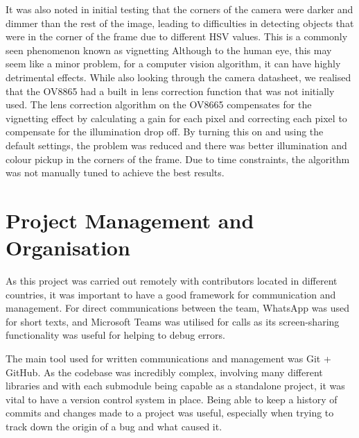 \documentclass[a4paper]{article}
\begin{document}
    It was also noted in 
    initial testing that the corners of the camera were darker and dimmer than the rest 
    of the image, leading to difficulties in detecting objects that were in the corner
    of the frame due to different HSV values. This is a commonly seen phenomenon known as vignetting
    Although to the human eye, this may seem
    like a minor problem, for a computer vision algorithm, it can have highly detrimental 
    effects. \cite{zheng2008single} While also looking through the camera datasheet, 
    we realised that the OV8865 had a built in lens correction function that was not initially
    used. The lens correction algorithm on the OV8665 compensates for the vignetting effect by 
    calculating a gain for each pixel and correcting each pixel to compensate for the illumination
    drop off. \cite{OV8865DataSheet} By turning this on and using the default settings, 
    the problem was reduced and there was better illumination and colour pickup in the corners
    of the frame. Due to time constraints, the algorithm was not manually tuned to achieve
    the best results. 

\section{Project Management and Organisation}
As this project was carried out remotely
with contributors located in different countries, 
it was important to have a good framework for communication and management. 
For direct communications between the team, WhatsApp was used for short texts, 
and Microsoft Teams was utilised for calls as its screen-sharing functionality 
was useful for helping to debug errors. 

The main tool used for written communications and management was Git + GitHub.
As the codebase was incredibly complex, 
involving many different libraries and with each submodule being capable as a
standalone project, it was vital to have a version control system in place. 
Being able to keep a history of commits and changes made to a project was useful,
especially when trying to track down the origin of a bug and what caused it. 
\end{document}
